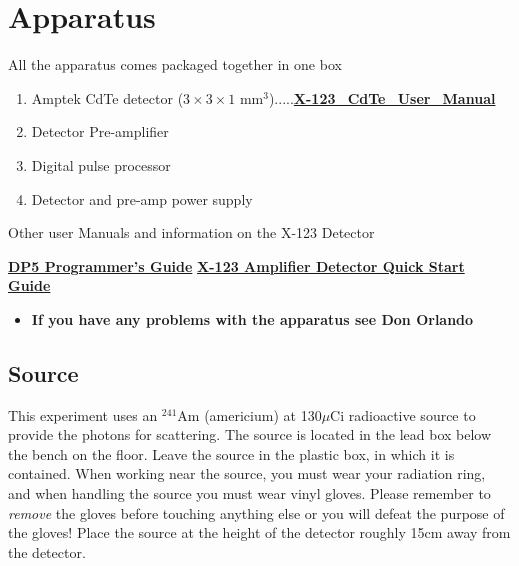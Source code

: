 \documentclass{../lab}
\begin{document}
\section{Apparatus}

All the apparatus comes packaged together in one box

\begin{enumerate}
    \item Amptek CdTe detector ($3 \times 3 \times 1$ mm$^{3}$).....\href{http://experimentationlab.berkeley.edu/sites/default/files/images/X-123\_CdTe\_User\_Manual.pdf}{\textbf{X-123\_CdTe\_User\_Manual}}

    \item Detector Pre-amplifier

    \item Digital pulse processor

    \item Detector and pre-amp power supply

\end{enumerate}

Other user Manuals and information on the X-123 Detector

\href{http://experimentationlab.berkeley.edu/sites/default/files/images/DP5\_Programmers\_Guide\_A4.pdf}{\textbf{DP5 Programmer's Guide}} \href{http://experimentationlab.berkeley.edu/sites/default/files/images/X-123.pdf}{\textbf{X-123 Amplifier Detector Quick Start Guide}}

\begin{itemize}
    \item \textbf{If you have any problems with the apparatus see Don Orlando}
\end{itemize}

\subsection{Source}

This experiment uses an $^{241}$Am (americium) at 130$\mu$Ci radioactive source to provide the photons for scattering. The source is located in the lead box below the bench on the floor. Leave the source in the plastic box, in which it is contained. When working near the source, you must wear your radiation ring, and when handling the source you must wear vinyl gloves. Please remember to \emph{remove }the gloves before touching anything else or you will defeat the purpose of the gloves! Place the source at the height of the detector roughly 15cm away from the detector.
\end{document}
